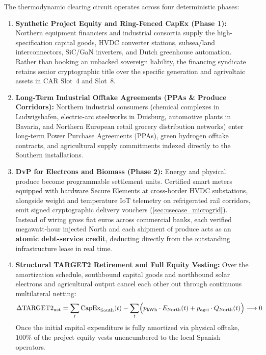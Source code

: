 \documentclass[a4paper,11pt,twoside,parskip=half-,headings=small]{scrartcl}
\begin{document}
The thermodynamic clearing circuit operates across four deterministic phases:
\begin{enumerate}[nosep]
  \item \textbf{Synthetic Project Equity and Ring-Fenced CapEx (Phase 1):} Northern equipment financiers and industrial consortia supply the high-specification capital goods, HVDC converter stations, subsea/land interconnectors, SiC/GaN inverters, and Dutch greenhouse automation. Rather than booking an unbacked sovereign liability, the financing syndicate retains senior cryptographic title over the specific generation and agrivoltaic assets in CAR Slot~4 and Slot~8.
  \item \textbf{Long-Term Industrial Offtake Agreements (PPAs \& Produce Corridors):} Northern industrial consumers (chemical complexes in Ludwigshafen, electric-arc steelworks in Duisburg, automotive plants in Bavaria, and Northern European retail grocery distribution networks) enter long-term Power Purchase Agreements (PPAs), green hydrogen offtake contracts, and agricultural supply commitments indexed directly to the Southern installations.
  \item \textbf{DvP for Electrons and Biomass (Phase 2):} Energy and physical produce become programmable settlement units. Certified smart meters equipped with hardware Secure Elements at cross-border HVDC substations, alongside weight and temperature IoT telemetry on refrigerated rail corridors, emit signed cryptographic delivery vouchers (\cref{sec:usecase_microgrid}). Instead of wiring gross fiat euros across commercial banks, each verified megawatt-hour injected North and each shipment of produce acts as an \textbf{atomic debt-service credit}, deducting directly from the outstanding infrastructure lease in real time.
  \item \textbf{Structural TARGET2 Retirement and Full Equity Vesting:} Over the amortization schedule, southbound capital goods and northbound solar electrons and agricultural output cancel each other out through continuous multilateral netting:
  \begin{equation}
    \Delta\text{TARGET2}_{\text{net}} = \sum_{t} \text{CapEx}_{\text{South}}(t) - \sum_{t} \Bigl( p_{\text{kWh}} \cdot E_{\text{North}}(t) + p_{\text{agri}} \cdot Q_{\text{North}}(t) \Bigr) \longrightarrow 0
    \label{eq:target2_amortization}
  \end{equation}
  Once the initial capital expenditure is fully amortized via physical offtake, $100\%$ of the project equity vests unencumbered to the local Spanish operators.
\end{enumerate}
\end{document}
